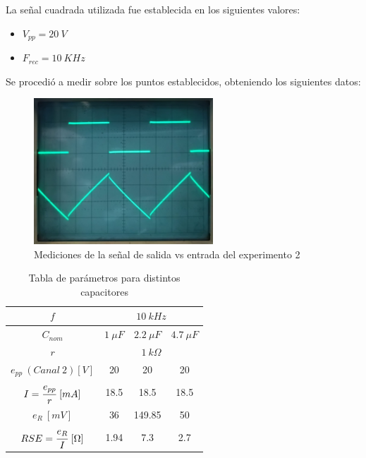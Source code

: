 La señal cuadrada utilizada fue establecida en los siguientes valores: 
\begin{itemize}
    \item $V_{pp}=20~V$
    \item  $F_{rec}=10 ~KHz$
\end{itemize}

Se procedió a medir sobre los puntos establecidos, obteniendo los siguientes datos:
\begin{figure}[H]
    \centering
    \includegraphics[width=0.6\textwidth]{Imagenes/MedExp2.jpeg}
    \caption{Mediciones de la señal de salida vs entrada del experimento 2}

\end{figure}
\begin{table}[H]
    \centering
    \begin{tabular}{|c|c|c|c|}
    \hline
        $f$ & \multicolumn{3}{c|}{$10~kHz$}\\
    \hline
        $C_{nom}$ & $1~\mu F$ & $2.2~\mu F$ & $4.7~\mu F$ \\ 
    \hline
        $r$ & \multicolumn{3}{c|}{$1~k\Omega$}\\
    \hline
        $e_{pp}~(Canal~2)[V]$ & 20 & 20 & 20\\
        $I=\cfrac{e_{pp}}{r} ~[mA]$ & 18.5 & 18.5 & 18.5 \\
        $e_R~[mV]$ & 36 & 149.85 & 50 \\
        $RSE = \cfrac{e_R}{I} ~[\Omega]$ & 1.94 & 7.3 & 2.7 \\
    \hline    
    
        \end{tabular}
        \def\tablename{Tabla} 
        \caption{Tabla de parámetros para distintos capacitores}
        \label{tab:exp2}
\end{table}

